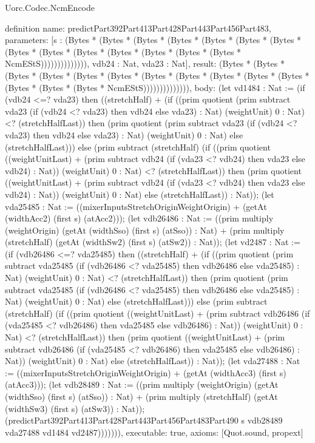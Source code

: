 \begin{lexlean}{Uorc.Codec.NcmEncode}
\begin{semanticmodule}
definition{
  name: predictPart392Part413Part428Part443Part456Part483,
  parameters: [s : (Bytes * (Bytes * (Bytes * (Bytes * (Bytes * (Bytes * (Bytes * (Bytes * (Bytes * (Bytes * (Bytes * (Bytes * (Bytes * (Bytes * NcmEStS)))))))))))))), vdb24 : Nat, vda23 : Nat],
  result: (Bytes * (Bytes * (Bytes * (Bytes * (Bytes * (Bytes * (Bytes * (Bytes * (Bytes * (Bytes * (Bytes * (Bytes * (Bytes * (Bytes * NcmEStS)))))))))))))),
  body: (let vd1484 : Nat := (if (vdb24 <=? vda23) then ((stretchHalf) + (if ((prim quotient (prim subtract vda23 (if (vdb24 <? vda23) then vdb24 else vda23) : Nat) (weightUnit) 0 : Nat) <? (stretchHalfLast)) then (prim quotient (prim subtract vda23 (if (vdb24 <? vda23) then vdb24 else vda23) : Nat) (weightUnit) 0 : Nat) else (stretchHalfLast))) else (prim subtract (stretchHalf) (if ((prim quotient ((weightUnitLast) + (prim subtract vdb24 (if (vda23 <? vdb24) then vda23 else vdb24) : Nat)) (weightUnit) 0 : Nat) <? (stretchHalfLast)) then (prim quotient ((weightUnitLast) + (prim subtract vdb24 (if (vda23 <? vdb24) then vda23 else vdb24) : Nat)) (weightUnit) 0 : Nat) else (stretchHalfLast)) : Nat)); (let vda25485 : Nat := ((mixerInputsStretchOriginWeightOrigin) + (getAt (widthAcc2) (first s) (atAcc2))); (let vdb26486 : Nat := ((prim multiply (weightOrigin) (getAt (widthSso) (first s) (atSso)) : Nat) + (prim multiply (stretchHalf) (getAt (widthSw2) (first s) (atSw2)) : Nat)); (let vd2487 : Nat := (if (vdb26486 <=? vda25485) then ((stretchHalf) + (if ((prim quotient (prim subtract vda25485 (if (vdb26486 <? vda25485) then vdb26486 else vda25485) : Nat) (weightUnit) 0 : Nat) <? (stretchHalfLast)) then (prim quotient (prim subtract vda25485 (if (vdb26486 <? vda25485) then vdb26486 else vda25485) : Nat) (weightUnit) 0 : Nat) else (stretchHalfLast))) else (prim subtract (stretchHalf) (if ((prim quotient ((weightUnitLast) + (prim subtract vdb26486 (if (vda25485 <? vdb26486) then vda25485 else vdb26486) : Nat)) (weightUnit) 0 : Nat) <? (stretchHalfLast)) then (prim quotient ((weightUnitLast) + (prim subtract vdb26486 (if (vda25485 <? vdb26486) then vda25485 else vdb26486) : Nat)) (weightUnit) 0 : Nat) else (stretchHalfLast)) : Nat)); (let vda27488 : Nat := ((mixerInputsStretchOriginWeightOrigin) + (getAt (widthAcc3) (first s) (atAcc3))); (let vdb28489 : Nat := ((prim multiply (weightOrigin) (getAt (widthSso) (first s) (atSso)) : Nat) + (prim multiply (stretchHalf) (getAt (widthSw3) (first s) (atSw3)) : Nat)); (predictPart392Part413Part428Part443Part456Part483Part490 s vdb28489 vda27488 vd1484 vd2487))))))),
  executable: true,
  axioms: [Quot.sound, propext]
}


\end{semanticmodule}
\end{lexlean}
